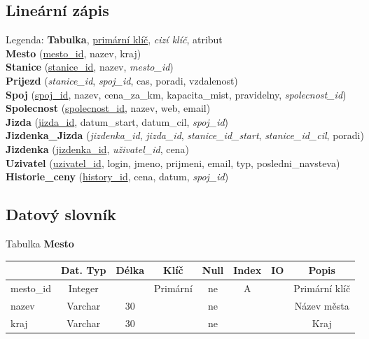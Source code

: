 \documentclass[11pt]{article}
\begin{document}
\newpage

\subsection{Lineární zápis}
Legenda: \textbf{Tabulka}, \underline{primární klíč}, \textit{cizí klíč}, atribut\\
\noindent
\textbf{Mesto} (\underline{mesto\_id}, nazev, kraj)\\
\textbf{Stanice} (\underline{stanice\_id}, nazev, \textit{mesto\_id})\\
\textbf{Prijezd} (\textit{stanice\_id}, \textit{spoj\_id}, cas, poradi, vzdalenost)\\
\textbf{Spoj} (\underline{spoj\_id}, nazev, cena\_za\_km, kapacita\_mist, pravidelny, \textit{spolecnost\_id})\\
\textbf{Spolecnost} (\underline{spolecnost\_id}, nazev, web, email)\\
\textbf{Jizda} (\underline{jizda\_id}, datum\_start, datum\_cil, \textit{spoj\_id})\\
\textbf{Jizdenka\_Jizda} (\textit{jizdenka\_id}, \textit{jizda\_id}, \textit{stanice\_id\_start}, \textit{stanice\_id\_cil}, poradi)\\
\textbf{Jizdenka} (\underline{jizdenka\_id}, \textit{uživatel\_id}, cena)\\
\textbf{Uzivatel} (\underline{uzivatel\_id}, login, jmeno, prijmeni, email, typ, posledni\_navsteva)\\
\textbf{Historie\_ceny} (\underline{history\_id}, cena, datum, \textit{spoj\_id})\\

\subsection{Datový slovník}

Tabulka \textbf{Mesto}

\begin{table}[H]
    \begin{tabular}{|l|c|c|c|c|c|c|c|} \hline
                & Dat. Typ  & Délka & Klíč      & Null  & Index & IO    & Popis \\ \hline
    mesto\_id   & Integer   &       & Primární  & ne    & A     &       & Primární klíč \\ \hline
    nazev       & Varchar   & 30    &           & ne    &       &       & Název města \\ \hline
    kraj        & Varchar   & 30    &           & ne    &       &       & Kraj \\ \hline
    \end{tabular}
\end{table}
\end{document}
